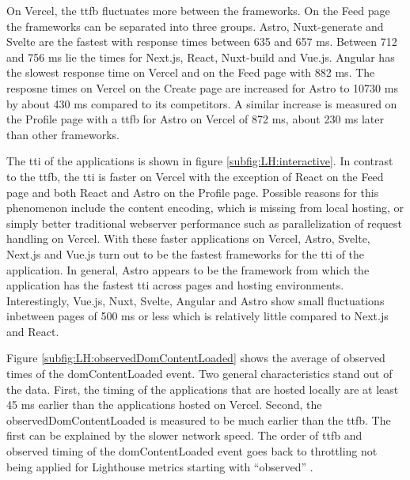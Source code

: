 \documentclass[a4paper, 12pt]{article}
\begin{document}
On Vercel, the \acrshort{ttfb} fluctuates more between the frameworks.
On the Feed page the frameworks can be separated into three groups.
Astro, Nuxt-generate and Svelte are the fastest with response times between 635 and 657 ms.
Between 712 and 756 ms lie the times for Next.js, React, Nuxt-build and Vue.js.
Angular has the slowest response time on Vercel and on the Feed page with 882 ms.
The resposne times on Vercel on the Create page are increased for Astro to 10730 ms by about 430 ms compared to its competitors.
A similar increase is measured on the Profile page with a \acrshort{ttfb} for Astro on Vercel of 872 ms, about 230 ms later than other frameworks.

The \acrlong{tti} of the applications is shown in figure \ref{subfig:LH:interactive}. In contrast to the \acrshort{ttfb}, the \acrshort{tti} is faster on Vercel with the exception of React on the Feed page and both React and Astro on the Profile page.
Possible reasons for this phenomenon include the content encoding, which is missing from local hosting, or simply better traditional webserver performance such as parallelization of request handling on Vercel.
With these faster applications on Vercel, Astro, Svelte, Next.js and Vue.js turn out to be the fastest frameworks for the \acrlong{tti} of the application.
In general, Astro appears to be the framework from which the application has the fastest \acrshort{tti} across pages and hosting environments.
Interestingly, Vue.js, Nuxt, Svelte, Angular and Astro show small fluctuations inbetween pages of 500 ms or less which is relatively little compared to Next.js and React.

Figure \ref{subfig:LH:observedDomContentLoaded} shows the average of observed times of the domContentLoaded event.
Two general characteristics stand out of the data.
First, the timing of the applications that are hosted locally are at least 45 ms earlier than the applications hosted on Vercel.
Second, the observedDomContentLoaded is measured to be much earlier than the \acrshort{ttfb}.
The first can be explained by the slower network speed.
The order of \acrshort{ttfb} and observed timing of the domContentLoaded event goes back to throttling not being applied for Lighthouse metrics starting with \enquote{observed} \citep{observedMetrics}.
\end{document}
